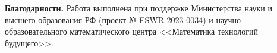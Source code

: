 \documentclass[a4paper,12pt,russian]{article}
\begin{document}

\textbf{Благодарности.} Работа выполнена при поддержке Министерства науки и высшего образования РФ (проект № FSWR-2023-0034) и научно-образовательного математического центра <<Математика технологий будущего>>.
\end{document}

